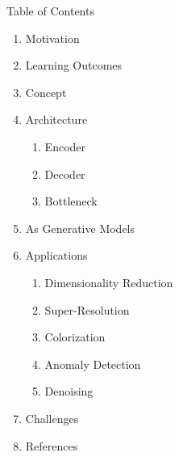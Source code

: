 \begin{frame}[t, allowframebreaks]{Table of Contents}
\begin{enumerate}
    \item Motivation
    \item Learning Outcomes
    \item Concept
    \item Architecture
    \begin{enumerate}
        \item Encoder
        \item Decoder
        \item Bottleneck
    \end{enumerate}
    \item As Generative Models
    \item Applications
        \begin{enumerate}
            \item Dimensionality Reduction
            \item Super-Resolution
            \item Colorization
            \item Anomaly Detection
            \item Denoising
        \end{enumerate}
    \item Challenges
    \item References
\end{enumerate}
\end{frame}


